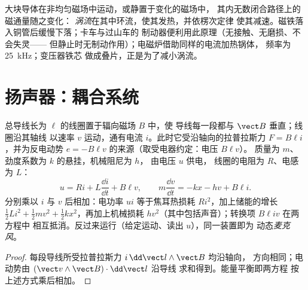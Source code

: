 \begin{example}[涡流]\label{ex:b1:induction:eddy}
大块导体在非均匀磁场中运动，或静置于变化的磁场中，
其内无数闭合路径上的磁通量随之变化：
\emph{涡流}在其中环流，使其发热，并依楞次定律
使其减速。磁铁落入铜管后缓慢下落；卡车与过山车的
制动器便利用此原理（无接触、无磨损、不会失灵——
但静止时无制动作用）；电磁炉借助同样的电流加热锅体，
频率为 \qty{25}{kHz}；变压器铁芯
做成叠片，正是为了减小涡流。
\end{example}

\section{扬声器：耦合系统}

\begin{proposition}[线圈在辐向磁场中的机电耦合]\label{prop:b1:induction:loudspeaker}
总导线长为 $\ell$ 的线圈置于辐向磁场 $B$ 中，使
导线每一段都与 $\vect B$ 垂直；线圈沿其轴线
以速率 $v$ 运动，通有电流 $i$。此时它受沿轴向的拉普拉斯力
$F = B\ell i$，并为反电动势 $e = -B\ell v$ 的来源（取受电器约定：电压 $B\ell v$）。
质量为 $m$、劲度系数为 $k$ 的悬挂，机械阻尼为 $h$，
由电压 $u$ 供电，
线圈的电阻为 $R$、电感为 $L$：
\[
u = Ri + L\frac{\dd i}{\dd t} + B\ell v , \qquad
m\frac{\dd v}{\dd t} = -kx - hv + B\ell i .
\]
分别乘以 $i$ 与 $v$ 后相加：电功率 $ui$
等于焦耳热损耗 $Ri^2$，加上储能的增长
$\tfrac12Li^2 + \tfrac12mv^2 + \tfrac12kx^2$，再加上机械损耗
$hv^2$（其中包括声音）；转换项 $B\ell iv$ 在两方程中
相互抵消。反过来运行（给定运动、读出 $u$），同一装置即为
动态\emph{麦克风}。
\end{proposition}

\begin{proof}
每段导线所受拉普拉斯力 $i\,\dd\vect l\wedge\vect B$ 均沿轴向，
方向相同；电动势由 $(\vect v\wedge\vect B)\cdot\dd\vect l$ 沿导线
求和得到。能量平衡即两方程
按上述方式乘后相加。
\end{proof}

